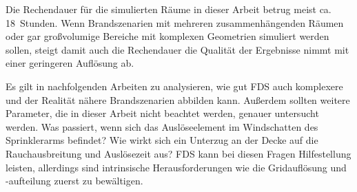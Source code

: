 Die Rechendauer für die simulierten Räume in dieser Arbeit betrug meist ca. 18~Stunden. Wenn Brandszenarien mit mehreren zusammenhängenden Räumen oder gar großvolumige Bereiche mit komplexen Geometrien simuliert werden sollen, steigt damit auch die Rechendauer \bzw die Qualität der Ergebnisse nimmt mit einer geringeren Auflösung ab.

Es gilt in nachfolgenden Arbeiten zu analysieren, wie gut FDS auch komplexere und der Realität nähere Brandszenarien abbilden kann. 
Außerdem sollten weitere Parameter, die in dieser Arbeit nicht beachtet werden, genauer untersucht werden. Was passiert, wenn sich das Auslöseelement im Windschatten des Sprinklerarms befindet? Wie wirkt sich ein Unterzug an der Decke auf die Rauchausbreitung und Auslösezeit aus?
FDS kann bei diesen Fragen Hilfestellung leisten, allerdings sind intrinsische Herausforderungen wie \zB die Gridauflösung und -aufteilung zuerst zu bewältigen. 

\begin{comment}
Insgesamt kann davon ausgegangen werden, dass in Zukunft immer mehr Brandschutzkonzepte mithilfe von CFD-Software validiert werden. 

 Echte Brandversuche sind sehr teuer und stellen keine wirtschaftliche Alternative dar.

zeigt aber auch die vielen möglichkeiten von fds auf

In Deutschland beträgt die maximale Auslösezeit für Sprinkler gemäß VDI 6019 Blatt 1{\cite{VDI6019B1}} 900 Sekunden. 
Fazit:

langsam ansteigende Elementtemperatur führt zu ungenaueren ergebnissen mit fds 



brandherd am boden oft unrealistisch. bei räumen mit hoher Deckenhöhe befindet sich die Brandlast wahrscheinlich auch weiter unter der Decke.




Sprinkler dürfen auch nicht zu früh öffnen 

SFPE Handbuch geht nicht auf die max. spez. Wärmefreisetzungsrate


was in zukunft beachtet werden muss:
\begin{itemize}
    \item HRR Kurve ist treppenförmig. entspricht nicht genau der t2 kurve
    \item unterschiedliche gasarten müssten untersucht werden
    \item Modell muss weiter verbessert werden
\end{itemize}

\end{comment}